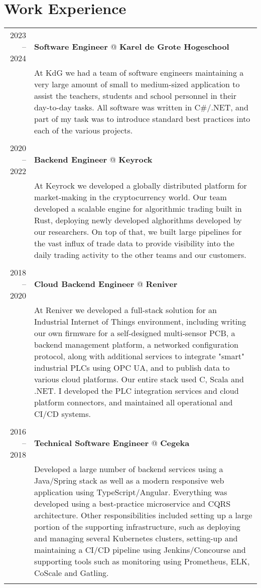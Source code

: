 \documentclass[a4paper,10pt]{article}
\begin{document}
\section{\textcolor{awesome-red}{Wor}k Experience}
	\begin{tabular}{r|p{11cm}}

	\textsc{2023 – 2024} & \textbf{Software Engineer} @ \textbf{Karel de Grote Hogeschool} \\ 
	& \footnotesize{At KdG we had a team of software engineers maintaining a very large amount of small to medium-sized application to assist the teachers, students and school personnel in their day-to-day tasks. All software was written in C\#/.NET, and part of my task was to introduce standard best practices into each of the various projects. } \\
	\multicolumn{2}{c}{} \\
	

	\textsc{2020 – 2022} & \textbf{Backend Engineer} @ \textbf{Keyrock} \\ 
	& \footnotesize{At Keyrock we developed a globally distributed platform for market-making in the cryptocurrency world. Our team developed a scalable engine for algorithmic trading built in Rust, deploying newly developed alghorithms developed by our researchers. On top of that, we built large pipelines for the vast influx of trade data to provide visibility into the daily trading activity to the other teams and our customers.} \\
	\multicolumn{2}{c}{} \\
        

	\textsc{2018 – 2020} & \textbf{Cloud Backend Engineer} @ \textbf{Reniver} \\ 
	& \footnotesize{At Reniver we developed a full-stack solution for an Industrial Internet of Things environment, including writing our own firmware for a self-designed multi-sensor PCB, a backend management platform, a networked configuration protocol, along with additional services to integrate "smart" industrial PLCs using OPC UA, and to publish data to various cloud platforms. Our entire stack used C, Scala and .NET. I developed the PLC integration services and cloud platform connectors, and maintained all operational and CI/CD systems.} \\
	\multicolumn{2}{c}{} \\
	
	
	\textsc{2016 – 2018} & \textbf{Technical Software Engineer} @ \textbf{Cegeka} \\ 
	& \footnotesize{Developed a large number of backend services using a Java/Spring stack as well as a modern responsive web application using TypeScript/Angular. Everything was developed using a best-practice microservice and CQRS architecture. Other responsibilities included setting up a large portion of the supporting infrastructure, such as deploying and managing several Kubernetes clusters, setting-up and maintaining a CI/CD pipeline using Jenkins/Concourse and supporting tools such as monitoring using Prometheus, ELK, CoScale and Gatling.} \\
	\multicolumn{2}{c}{} \\


\end{tabular}
\end{document}

